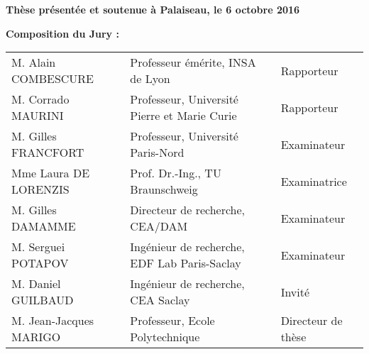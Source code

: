 \begin{titlepage}
\begin{mdframed}
\begin{minipage}[t][22cm][t]{\textwidth}
\vfill
\begin{flushleft}
\large
\textbf{Thèse présentée et soutenue à Palaiseau, le 6 octobre 2016}
\vspace{15pt}

\textbf{Composition du Jury :}

\vspace{15pt}
\begin{tabular}{@{}lll}
M. Alain COMBESCURE & Professeur émérite, INSA de Lyon & Rapporteur \\
M. Corrado MAURINI & Professeur, Université Pierre et Marie Curie & Rapporteur \\
M. Gilles FRANCFORT & Professeur, Université Paris-Nord & Examinateur \\
Mme Laura DE LORENZIS & Prof. Dr.-Ing., TU Braunschweig & Examinatrice \\
M. Gilles DAMAMME & Directeur de recherche, CEA/DAM & Examinateur \\
M. Serguei POTAPOV & Ingénieur de recherche, EDF Lab Paris-Saclay & Examinateur \\
M. Daniel GUILBAUD & Ingénieur de recherche, CEA Saclay & Invité \\
M. Jean-Jacques MARIGO & Professeur, Ecole Polytechnique & Directeur de thèse
\end{tabular}
\end{flushleft}
\end{minipage}
\end{mdframed}
\end{titlepage}

\setcounter{page}{2}
\restoregeometry
